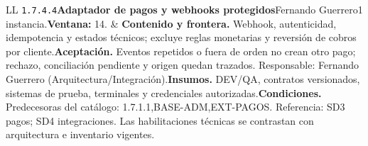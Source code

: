 \begin{longtable}{L{\tabcolsep\relax}L{\tabcolsep\relax}}
\texttt{1.\allowbreak{}7.\allowbreak{}4.\allowbreak{}4}\newline{}\textbf{Adaptador de pagos y webhooks protegidos}\newline{}Fernando Guerrero\newline{}1 instancia.\newline{}\textbf{Ventana:} 14. & \textbf{Contenido y frontera.} Webhook, autenticidad, idempotencia y estados técnicos; excluye reglas monetarias y reversión de cobros por cliente.\newline{}\textbf{Aceptación.} Eventos repetidos o fuera de orden no crean otro pago; rechazo, conciliación pendiente y origen quedan trazados. Responsable: Fernando Guerrero (Arquitectura/Integración).\newline{}\textbf{Insumos.} DEV/QA, contratos versionados, sistemas de prueba, terminales y credenciales autorizadas.\newline{}\textbf{Condiciones.} Predecesoras del catálogo: 1.7.1.1,BASE-ADM,EXT-PAGOS. Referencia: SD3 pagos; SD4 integraciones. Las habilitaciones técnicas se contrastan con arquitectura e inventario vigentes.\\\hline

\end{longtable}
